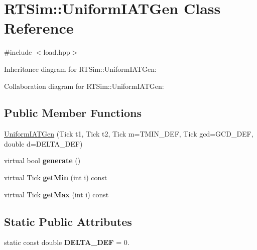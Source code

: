 \hypertarget{classRTSim_1_1UniformIATGen}{}\section{R\+T\+Sim\+:\+:Uniform\+I\+A\+T\+Gen Class Reference}
\label{classRTSim_1_1UniformIATGen}


{\ttfamily \#include $<$load.\+hpp$>$}



Inheritance diagram for R\+T\+Sim\+:\+:Uniform\+I\+A\+T\+Gen\+:


Collaboration diagram for R\+T\+Sim\+:\+:Uniform\+I\+A\+T\+Gen\+:
\subsection*{Public Member Functions}
\begin{DoxyCompactItemize}
\item 
\hyperlink{classRTSim_1_1UniformIATGen_af67c386843de547720fbf661c085d155}{Uniform\+I\+A\+T\+Gen} (Tick t1, Tick t2, Tick m=T\+M\+I\+N\+\_\+\+D\+EF, Tick gcd=G\+C\+D\+\_\+\+D\+EF, double d=D\+E\+L\+T\+A\+\_\+\+D\+EF)
\item 
virtual bool {\bfseries generate} ()\hypertarget{classRTSim_1_1UniformIATGen_a968815c5594f1ad08952c7a8c6cc88be}{}\label{classRTSim_1_1UniformIATGen_a968815c5594f1ad08952c7a8c6cc88be}

\item 
virtual Tick {\bfseries get\+Min} (int i) const \hypertarget{classRTSim_1_1UniformIATGen_a4e05044b9ee2be3add6dab92dfa1090d}{}\label{classRTSim_1_1UniformIATGen_a4e05044b9ee2be3add6dab92dfa1090d}

\item 
virtual Tick {\bfseries get\+Max} (int i) const \hypertarget{classRTSim_1_1UniformIATGen_a9437085c9a5b027dd90e648601903d05}{}\label{classRTSim_1_1UniformIATGen_a9437085c9a5b027dd90e648601903d05}

\end{DoxyCompactItemize}
\subsection*{Static Public Attributes}
\begin{DoxyCompactItemize}
\item 
static const double {\bfseries D\+E\+L\+T\+A\+\_\+\+D\+EF} = 0.\hypertarget{classRTSim_1_1UniformIATGen_ad8b11093a2f8d7b155388fa2b85ea47d}{}\label{classRTSim_1_1UniformIATGen_ad8b11093a2f8d7b155388fa2b85ea47d}

\end{DoxyCompactItemize}
